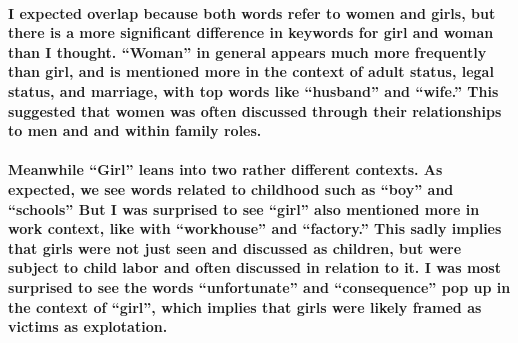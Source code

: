 \documentclass[
]{article}
\begin{document}
\paragraph{I expected overlap because both words refer to women and
girls, but there is a more significant difference in keywords for girl
and woman than I thought. ``Woman'' in general appears much more
frequently than girl, and is mentioned more in the context of adult
status, legal status, and marriage, with top words like ``husband'' and
``wife.'' This suggested that women was often discussed through their
relationships to men and and within family
roles.}\label{i-expected-overlap-because-both-words-refer-to-women-and-girls-but-there-is-a-more-significant-difference-in-keywords-for-girl-and-woman-than-i-thought.-woman-in-general-appears-much-more-frequently-than-girl-and-is-mentioned-more-in-the-context-of-adult-status-legal-status-and-marriage-with-top-words-like-husband-and-wife.-this-suggested-that-women-was-often-discussed-through-their-relationships-to-men-and-and-within-family-roles.}

\paragraph{Meanwhile ``Girl'' leans into two rather different contexts.
As expected, we see words related to childhood such as ``boy'' and
``schools'' But I was surprised to see ``girl'' also mentioned more in
work context, like with ``workhouse'' and ``factory.'' This sadly
implies that girls were not just seen and discussed as children, but
were subject to child labor and often discussed in relation to it. I was
most surprised to see the words ``unfortunate'' and ``consequence'' pop
up in the context of ``girl'', which implies that girls were likely
framed as victims as
explotation.}\label{meanwhile-girl-leans-into-two-rather-different-contexts.-as-expected-we-see-words-related-to-childhood-such-as-boy-and-schools-but-i-was-surprised-to-see-girl-also-mentioned-more-in-work-context-like-with-workhouse-and-factory.-this-sadly-implies-that-girls-were-not-just-seen-and-discussed-as-children-but-were-subject-to-child-labor-and-often-discussed-in-relation-to-it.-i-was-most-surprised-to-see-the-words-unfortunate-and-consequence-pop-up-in-the-context-of-girl-which-implies-that-girls-were-likely-framed-as-victims-as-explotation.}
\end{document}
